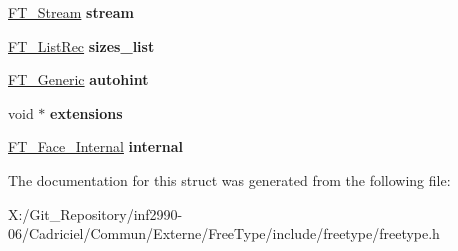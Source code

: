 \begin{DoxyCompactItemize}
\item 
\hypertarget{struct_f_t___face_rec___a831d5da25cd0fe2a783d2a73f467de55}{\hyperlink{struct_f_t___stream_rec__}{F\-T\-\_\-\-Stream} {\bfseries stream}}\label{struct_f_t___face_rec___a831d5da25cd0fe2a783d2a73f467de55}

\item 
\hypertarget{struct_f_t___face_rec___a47504203e02bfba59c802c35cb4009ed}{\hyperlink{struct_f_t___list_rec__}{F\-T\-\_\-\-List\-Rec} {\bfseries sizes\-\_\-list}}\label{struct_f_t___face_rec___a47504203e02bfba59c802c35cb4009ed}

\item 
\hypertarget{struct_f_t___face_rec___a34ba9b1367f1b2d13676043b8da3ea73}{\hyperlink{struct_f_t___generic__}{F\-T\-\_\-\-Generic} {\bfseries autohint}}\label{struct_f_t___face_rec___a34ba9b1367f1b2d13676043b8da3ea73}

\item 
\hypertarget{struct_f_t___face_rec___a8b24f993e38da597d3e0273267890f49}{void $\ast$ {\bfseries extensions}}\label{struct_f_t___face_rec___a8b24f993e38da597d3e0273267890f49}

\item 
\hypertarget{struct_f_t___face_rec___aed9a1267cddcbe790f0591471c886537}{\hyperlink{struct_f_t___face___internal_rec__}{F\-T\-\_\-\-Face\-\_\-\-Internal} {\bfseries internal}}\label{struct_f_t___face_rec___aed9a1267cddcbe790f0591471c886537}

\end{DoxyCompactItemize}


The documentation for this struct was generated from the following file\-:\begin{DoxyCompactItemize}
\item 
X\-:/\-Git\-\_\-\-Repository/inf2990-\/06/\-Cadriciel/\-Commun/\-Externe/\-Free\-Type/include/freetype/freetype.\-h\end{DoxyCompactItemize}
